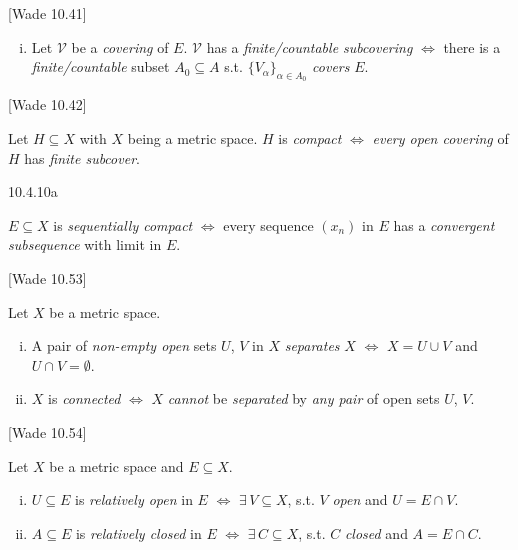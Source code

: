 \documentclass[10pt]{article} %
\newcommand{\cw}[1]{[Wade #1]}
\begin{document}
\begin{multicols}{3}
\begin{definition}{\cw{10.41}}{}
\begin{enumerate}[i)]
            \item Let $\mathcal{V}$ be a \emph{covering} of $E$. $\mathcal{V}$ has a \emph{finite/countable subcovering} $\Leftrightarrow$ there is a \emph{finite/countable} subset $A_0 \subseteq A$ s.t. $\{V_{\alpha}\}_{\alpha \in A_0}$ \emph{covers} $E$.
        \end{enumerate}

\end{definition}

\begin{definition}{\cw{10.42}}{}

    Let $H \subseteq X$ with $X$ being a metric space. $H$ is \emph{compact} $\Leftrightarrow$ \emph{every open covering} of $H$ has \emph{finite subcover}.

\end{definition}

\begin{definition}{10.4.10a}{}

    $E \subseteq X$ is \emph{sequentially compact} $\Leftrightarrow$ every sequence $(x_n)$ in $E$ has a \emph{convergent subsequence} with limit in $E$.

\end{definition}

\begin{definition}{\cw{10.53}}{}

    Let $X$ be a metric space.

        \begin{enumerate}[i)]
            \setlength{\parskip}{0em}
            \item A pair of \emph{non-empty open} sets $U$, $V$ in $X$ \emph{separates} $X$ $\Leftrightarrow$ $X = U \cup V$ and $U \cap V = \emptyset$.
            \item $X$ is \emph{connected} $\Leftrightarrow$ $X$ \emph{cannot} be \emph{separated} by \emph{any pair} of open sets $U$, $V$.
        \end{enumerate}

\end{definition}

\begin{definition}{\cw{10.54}}{}

    Let $X$ be a metric space and $E \subseteq X$.

        \begin{enumerate}[i)]
            \setlength{\parskip}{0em}
            \item $U \subseteq E$ is \emph{relatively open} in $E$ $\Leftrightarrow$ $\exists\, V \subseteq X$, s.t. $V$ \emph{open} and $U = E \cap V$.
            \item $A \subseteq E$ is \emph{relatively closed} in $E$ $\Leftrightarrow$ $\exists\, C \subseteq X$, s.t. $C$ \emph{closed} and $A = E \cap C$.
        \end{enumerate}


\end{definition}
\end{multicols}
\end{document}
